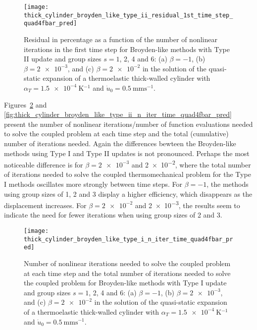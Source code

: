 \begin{figure}[htbp]
  \centering
  \texttt{[image: thick\_cylinder\_broyden\_like\_type\_ii\_residual\_1st\_time\_step\_quad4fbar\_pred]}
  \caption{Residual in percentage as a function of the number of nonlinear iterations in the first time step for Broyden-like methods with Type II update and group sizes \(s=1\), 2, 4 and 6: (a) \(\beta=-1\), (b) \(\beta=\num{2e-3}\), and (c) \(\beta=\num{2e-2}\) in the solution of the quasi-static expansion of a thermoelastic thick-walled cylinder with \(\alpha_T=\SI{1.5e-4}{\kelvin^{-1}}\) and \(\dot u_0 =\SI{0.5}{\milli\meter\second^{-1}}\).}
\label{fig:thick_cylinder_broyden_like_type_ii_residual_1st_time_step_quad4fbar_pred}
\end{figure}

Figures~\ref{fig:thick_cylinder_broyden_like_type_i_n_iter_time_quad4fbar_pred} and \ref{fig:thick_cylinder_broyden_like_type_ii_n_iter_time_quad4fbar_pred} present the number of nonlinear iterations/number of function evaluations needed to solve the coupled problem at each time step and the total (cumulative) number of iterations needed.
Again the differences bewteen the Broyden-like methods using Type I and Type II updates is not pronounced.
Perhaps the most noticeable difference is for \(\beta=\num{2e-3}\) and \num{2e-2}, where the total number of iterations needed to solve the coupled thermomechanical problem for the Type I methods oscillates more strongly between time steps.
For \(\beta=-1\), the methods using group sizes of 1, 2 and 3 display a higher efficiency, which disappears as the displacement increases.
For \(\beta=\num{2e-2}\) and \num{2e-3}, the results seem to indicate the need for fewer iterations when using group sizes of 2 and 3.

\begin{figure}[htbp]
  \centering
  \texttt{[image: thick\_cylinder\_broyden\_like\_type\_i\_n\_iter\_time\_quad4fbar\_pred]}
  \caption{Number of nonlinear iterations needed to solve the coupled problem at each time step and the total number of iterations needed to solve the coupled problem for Broyden-like methods with Type I update and group sizes \(s=1\), 2, 4 and 6: (a) \(\beta=-1\), (b) \(\beta=\num{2e-3}\), and (c) \(\beta=\num{2e-2}\) in the solution of the quasi-static expansion of a thermoelastic thick-walled cylinder with \(\alpha_T=\SI{1.5e-4}{\kelvin^{-1}}\) and \(\dot u_0 =\SI{0.5}{\milli\meter\second^{-1}}\).}
\label{fig:thick_cylinder_broyden_like_type_i_n_iter_time_quad4fbar_pred}
\end{figure}

